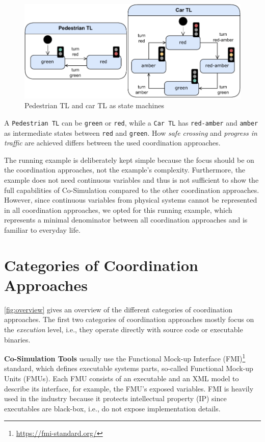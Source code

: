\documentclass[runningheads]{llncs}
\begin{document}
\begin{figure}[ht]
	\centering
	\includegraphics[width=1\textwidth]{images/running_example_models}
	\caption{Pedestrian TL and car TL as state machines}
	\label{fig:stateMachinesRunningExample}
\end{figure}

A \texttt{Pedestrian TL} can be \texttt{green} or \texttt{red}, while a \texttt{Car TL} has \texttt{red-amber} and \texttt{amber} as intermediate states between \texttt{red} and \texttt{green}.
How \textit{safe crossing} and \textit{progress in traffic} are achieved differs between the used coordination approaches.

The running example is deliberately kept simple because the focus should be on the coordination approaches, not the example's complexity.
Furthermore, the example does not need continuous variables and thus is not sufficient to show the full capabilities of Co-Simulation compared to the other coordination approaches.
However, since continuous variables from physical systems cannot be represented in all coordination approaches, we opted for this running example, which represents a minimal denominator between all coordination approaches and is familiar to everyday life.

\section{Categories of Coordination Approaches} \label{sec:approaches}

\autoref{fig:overview} gives an overview of the different categories of coordination approaches.
The first two categories of coordination approaches mostly focus on the \textit{execution} level, i.e., they operate directly with source code or executable binaries.

\textbf{Co-Simulation Tools} usually use the Functional Mock-up Interface (FMI)\footnote{\url{https://fmi-standard.org/}} standard, which defines executable systems parts, so-called Functional Mock-up Units (FMUs).
Each FMU consists of an executable and an XML model to describe its interface, for example, the FMU's exposed variables.
FMI is heavily used in the industry because it protects intellectual property (IP) since executables are black-box, i.e., do not expose implementation details.
\end{document}
